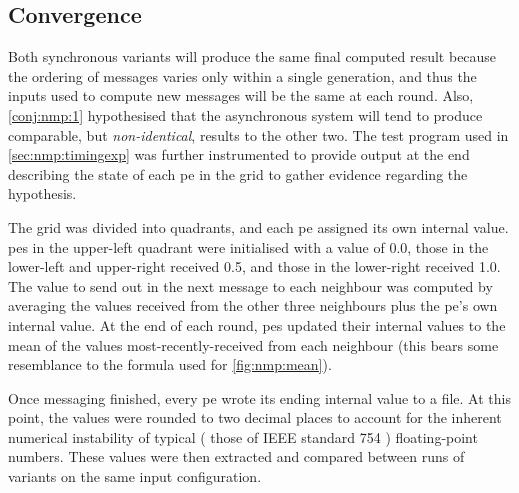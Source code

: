 \subsection{\label{sec:nmp:convergence}Convergence}
Both synchronous variants will produce the same final computed result because the ordering of messages varies only within a single generation, and thus the inputs used to compute new messages will be the same at each round.  Also, \cref{conj:nmp:1} hypothesised that the asynchronous system will tend to produce comparable, but \emph{non-identical}, results to the other two.  The test program used in \cref{sec:nmp:timingexp} was further instrumented to provide output at the end describing the state of each \gls{pe} in the grid to gather evidence regarding the hypothesis.

The grid was divided into quadrants, and each \gls{pe} assigned its own internal value.  \Glspl{pe} in the upper-left quadrant were initialised with a value of 0.0, those in the lower-left and upper-right received 0.5, and those in the lower-right received 1.0.  The value to send out in the next message to each neighbour was computed by averaging the values received from the other three neighbours plus the \gls{pe}'s own internal value.  At the end of each round, \glspl{pe} updated their internal values to the mean of the values most-recently-received from each neighbour (this bears some resemblance to the formula used for \cref{fig:nmp:mean}).

Once messaging finished, every \gls{pe} wrote its ending internal value to a file.  At this point, the values were rounded to two decimal places to account for the inherent numerical instability of typical (\eg{} those of IEEE standard 754 \cite{ieee754,Goldberg1991}) floating-point numbers.  These values were then extracted and compared between runs of variants on the same input configuration.

